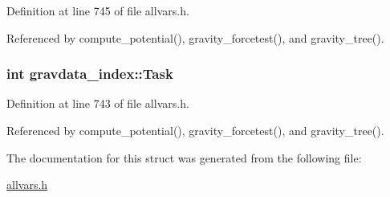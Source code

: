 Definition at line 745 of file allvars.h.



Referenced by compute\_\-potential(), gravity\_\-forcetest(), and gravity\_\-tree().

\hypertarget{structgravdata__index_afacf7009bcd9677cf8ddff3dc927d6c5}{
\subsubsection[{Task}]{\setlength{\rightskip}{0pt plus 5cm}int {\bf gravdata\_\-index::Task}}}
\label{structgravdata__index_afacf7009bcd9677cf8ddff3dc927d6c5}


Definition at line 743 of file allvars.h.



Referenced by compute\_\-potential(), gravity\_\-forcetest(), and gravity\_\-tree().



The documentation for this struct was generated from the following file:\begin{DoxyCompactItemize}
\item 
\hyperlink{allvars_8h}{allvars.h}\end{DoxyCompactItemize}
